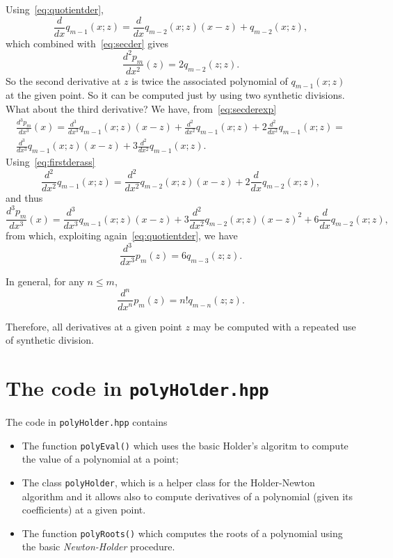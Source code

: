 \documentclass[10pt,a4paper]{article}
\theoremstyle{definition}%
\begin{document}
Using~\eqref{eq:quotientder},
\begin{equation}\label{eq:firstderass}
\frac{d}{dx}q_{m-1}(x;z)=\frac{d}{dx}q_{m-2}(x;z)(x-z)+ q_{m-2}(x;z),
\end{equation}
which combined with~\eqref{eq:secder} gives
\begin{equation}\label{eq:secderivative}
\frac{d^2p_m}{dx^2}(z)=2 q_{m-2}(z;z).
\end{equation}
So the second derivative at $z$ is twice the associated polynomial of $q_{m-1}(x;z)$ at the given point. So it can be computed just by using two synthetic divisions.
What about the third derivative? We have, from~\eqref{eq:secderexp}
\begin{multline}\label{eq:secderexptwo}
\frac{d^3p_m}{dx^3}(x)=\frac{d^3}{dx^3}q_{m-1}(x;z)(x-z) +\frac{d^2}{dx^2}q_{m-1}(x;z) + 2 \frac{d^2}{dx^2} q_{m-1}(x;z)=\\
\frac{d^3}{dx^3}q_{m-1}(x;z)(x-z) +3\frac{d^2}{dx^2}q_{m-1}(x;z).
\end{multline}
Using~\eqref{eq:firstderass}
\begin{equation}
\frac{d^2}{dx^2}q_{m-1}(x;z)=\frac{d^2}{dx^2}q_{m-2}(x;z)(x-z)+2\frac{d}{dx}q_{m-2}(x;z),
\end{equation}
and thus
\begin{equation}\label{eq:thirdder}
\frac{d^3p_m}{dx^3}(x)=
\frac{d^3}{dx^3}q_{m-1}(x;z)(x-z) +3\frac{d^2}{dx^2}q_{m-2}(x;z)(x-z)^2 + 6\frac{d}{dx}q_{m-2}(x;z),
\end{equation}
from which, exploiting again~\eqref{eq:quotientder}, we have
\begin{equation}\label{eq:thirdderz}
\frac{d^3}{dx^3}p_m(z)=6 q_{m-3}(z;z).
\end{equation}

In general, for any $n\le m$,
\begin{equation}
\boxed{\frac{d^n}{dx^n}p_m(z)=n! q_{m-n}(z;z).}
\end{equation}

Therefore, all derivatives at a given point $z$ may be computed with a repeated use of synthetic division.


\section{The code in \texttt{polyHolder.hpp}}
The code in \texttt{polyHolder.hpp} contains
\begin{itemize}
    \item The function \lstinline|polyEval()| which uses the basic Holder's algoritm to compute the value of a polynomial at a point;
    \item The class \lstinline|polyHolder|, which is a helper class for the Holder-Newton algorithm and it allows also to compute derivatives of a polynomial (given its coefficients) at a given point.
    \item The function \lstinline|polyRoots()| which computes the roots of a polynomial using the basic \emph{Newton-Holder} procedure.
\end{itemize}
\end{document}
